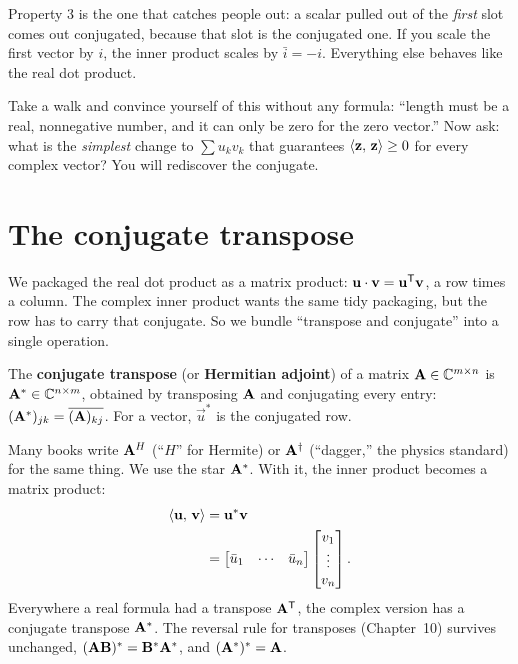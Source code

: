 Property 3 is the one that catches people out: a scalar pulled out of the
\emph{first} slot comes out conjugated, because that slot is the conjugated one.
If you scale the first vector by $i$, the inner product scales by $\bar i = -i$.
Everything else behaves like the real dot product.

\begin{walkbox}
Take a walk and convince yourself of this without any formula: ``length must be a
real, nonnegative number, and it can only be zero for the zero vector.'' Now ask:
what is the \emph{simplest} change to $\sum u_kv_k$ that guarantees
$\langle \mathbf{z},\, \mathbf{z} \rangle\ge 0$ for every complex vector? You will rediscover the
conjugate.
\end{walkbox}

\section{The conjugate transpose}

We packaged the real dot product as a matrix product: $\mathbf{u}\cdot\mathbf{v} =
\mathbf{u}^{\mathsf{T}}\mathbf{v}$, a row times a column. The complex inner product wants the same
tidy packaging, but the row has to carry that conjugate. So we bundle ``transpose
and conjugate'' into a single operation.

\begin{definition}\label{ch32:adjoint}
The \textbf{conjugate transpose} (or \textbf{Hermitian adjoint}) of a matrix
$\mathbf{A}\in\mathbb{C}^{m\times n}$ is $\mathbf{A}^{*}\in\mathbb{C}^{n\times m}$, obtained by transposing
$\mathbf{A}$ and conjugating every entry: $(\mathbf{A}^{*})_{jk} = \overline{(\mathbf{A})_{kj}}$.
For a vector, $\vec u^{*}$ is the conjugated row.
\end{definition}

Many books write $\mathbf{A}^{H}$ (``$H$'' for Hermite) or $\mathbf{A}^{\dagger}$ (``dagger,''
the physics standard) for the same thing. We use the star $\mathbf{A}^{*}$. With it,
the inner product becomes a matrix product:
\begin{align*}
  \langle \mathbf{u},\, \mathbf{v} \rangle &= \mathbf{u}^{*}\mathbf{v} \\
  &= \begin{bmatrix}\bar u_1 & \cdots & \bar u_n\end{bmatrix}
        \begin{bmatrix}v_1\\\vdots\\v_n\end{bmatrix}.
\end{align*}
Everywhere a real formula had a transpose $\mathbf{A}^{\mathsf{T}}$, the complex version
has a conjugate transpose $\mathbf{A}^{*}$. The reversal rule for transposes
(Chapter~10) survives unchanged, $(\mathbf{A}\mathbf{B})^{*} = \mathbf{B}^{*}\mathbf{A}^{*}$, and
$(\mathbf{A}^{*})^{*} = \mathbf{A}$.

